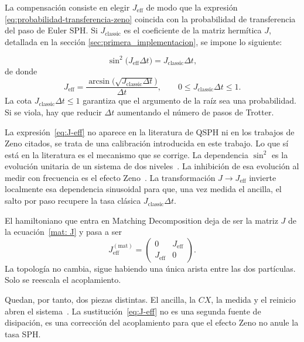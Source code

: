 La compensación consiste en elegir $J_{\mathrm{eff}}$ de modo que la expresión \eqref{eq:probabilidad-transferencia-zeno} coincida con la probabilidad de transferencia del paso de Euler SPH. Si $J_{\mathrm{classic}}$ es el coeficiente de la matriz hermítica $J$, detallada en la sección \ref{sec:primera_implementacion}, se impone lo siguiente:

\begin{equation}
    \sin^{2}\bigl(J_{\mathrm{eff}}\Delta t\bigr)
    =
    J_{\mathrm{classic}}\Delta t,
    \label{eq:condicion-compensacion-zeno}
\end{equation}
de donde
\begin{equation}
    J_{\mathrm{eff}}
    =
    \frac{\arcsin\bigl(\sqrt{J_{\mathrm{classic}}\Delta t}\bigr)}{\Delta t},
    \qquad
    0\leq J_{\mathrm{classic}}\Delta t\leq 1.
    \label{eq:J-eff}
\end{equation}
La cota $J_{\mathrm{classic}}\Delta t\leq 1$ garantiza que el argumento de la raíz sea una probabilidad. Si se viola, hay que reducir $\Delta t$ aumentando el número de pasos de Trotter.

La expresión~\eqref{eq:J-eff} no aparece en la literatura de QSPH ni en los trabajos de Zeno citados, se trata de una calibración introducida en este trabajo. Lo que sí está en la literatura es el mecanismo que se corrige. La dependencia $\sin^{2}$ es la evolución unitaria de un sistema de dos niveles~\cite{nielsen2010}. La inhibición de esa evolución al medir con frecuencia es el efecto Zeno~\cite{Kondo2016QZE,Misra1977QZE}. La transformación $J\rightarrow J_{\mathrm{eff}}$ invierte localmente esa dependencia sinusoidal para que, una vez medida el ancilla, el salto por paso recupere la tasa clásica $J_{\mathrm{classic}}\Delta t$.

El hamiltoniano que entra en Matching Decomposition deja de ser la matriz $J$ de la ecuación~\eqref{mat: J} y pasa a ser
\begin{equation}
    J_{\mathrm{eff}}^{(\mathrm{mat})}
    =
    \begin{pmatrix}
        0 & J_{\mathrm{eff}}\\
        J_{\mathrm{eff}} & 0
    \end{pmatrix}.
    \label{eq:J-eff-matrix}
\end{equation}
La topología no cambia, sigue habiendo una única arista entre las dos partículas. Solo se reescala el acoplamiento.

Quedan, por tanto, dos piezas distintas. El ancilla, la $CX$, la medida y el reinicio abren el sistema~\cite{nielsen2010,Kondo2016QZE}. La sustitución~\eqref{eq:J-eff} no es una segunda fuente de disipación, es una corrección del acoplamiento para que el efecto Zeno no anule la tasa SPH. 

